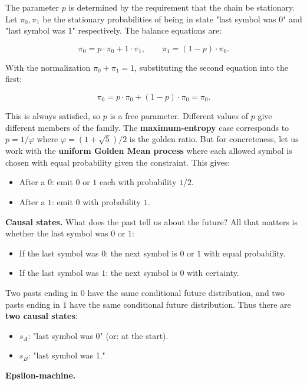 The parameter $p$ is determined by the requirement that the chain be stationary. Let $\pi_0, \pi_1$ be the stationary probabilities of being in state "last symbol was 0" and "last symbol was 1" respectively. The balance equations are:

\[
\pi_0 = p \cdot \pi_0 + 1 \cdot \pi_1, \qquad \pi_1 = (1-p) \cdot \pi_0.
\]

With the normalization $\pi_0 + \pi_1 = 1$, substituting the second equation into the first:

\[
\pi_0 = p \cdot \pi_0 + (1-p) \cdot \pi_0 = \pi_0.
\]

This is always satisfied, so $p$ is a free parameter. Different values of $p$ give different members of the family. The \textbf{maximum-entropy} case corresponds to $p = 1/\varphi$ where $\varphi = (1+\sqrt{5})/2$ is the golden ratio. But for concreteness, let us work with the \textbf{uniform Golden Mean process} where each allowed symbol is chosen with equal probability given the constraint. This gives:

\begin{itemize}
  \item After a $0$: emit $0$ or $1$ each with probability $1/2$.
  \item After a $1$: emit $0$ with probability $1$.
\end{itemize}

\textbf{Causal states.} What does the past tell us about the future? All that matters is whether the last symbol was $0$ or $1$:

\begin{itemize}
  \item If the last symbol was $0$: the next symbol is $0$ or $1$ with equal probability.
  \item If the last symbol was $1$: the next symbol is $0$ with certainty.
\end{itemize}

Two pasts ending in $0$ have the same conditional future distribution, and two pasts ending in $1$ have the same conditional future distribution. Thus there are \textbf{two causal states}:

\begin{itemize}
  \item $s_A$: "last symbol was 0" (or: at the start).
  \item $s_B$: "last symbol was 1."
\end{itemize}

\textbf{Epsilon-machine.}

